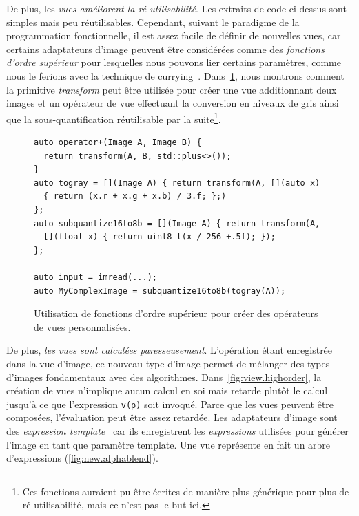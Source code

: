 De plus, les \emph{vues améliorent la ré-utilisabilité}. Les extraits de code ci-dessus sont simples mais peu
réutilisables. Cependant, suivant le paradigme de la programmation fonctionnelle, il est assez facile de définir de
nouvelles vues, car certains adaptateurs d'image peuvent être considérées comme des \emph{fonctions d'ordre supérieur}
pour lesquelles nous pouvons lier certains paramètres, comme nous le ferions avec la technique de
currying~\parencite{hanus.1995.curry}. Dans~\cref{resume:fig:view.highorder}, nous montrons comment la primitive
\emph{transform} peut être utilisée pour créer une vue additionnant deux images et un opérateur de vue effectuant la
conversion en niveaux de gris ainsi que la sous-quantification réutilisable par la suite\footnote{Ces fonctions auraient
  pu être écrites de manière plus générique pour plus de ré-utilisabilité, mais ce n'est pas le but ici.}.

\begin{figure}
  \begin{verbatim}
auto operator+(Image A, Image B) {
  return transform(A, B, std::plus<>());
}
auto togray = [](Image A) { return transform(A, [](auto x)
  { return (x.r + x.g + x.b) / 3.f; };)
};
auto subquantize16to8b = [](Image A) { return transform(A,
  [](float x) { return uint8_t(x / 256 +.5f); });
};

auto input = imread(...);
auto MyComplexImage = subquantize16to8b(togray(A));
  \end{verbatim}

  \caption[]{Utilisation de fonctions d'ordre supérieur pour créer des opérateurs de vues personnalisées.}
  \label{resume:fig:view.highorder}
\end{figure}

De plus, \emph{les vues sont calculées paresseusement}. L'opération étant enregistrée dans la vue d'image, ce nouveau
type d'image permet de mélanger des types d'images fondamentaux avec des algorithmes. Dans~\cref{fig:view.highorder}, la
création de vues n'implique aucun calcul en soi mais retarde plutôt le calcul jusqu'à ce que l'expression \texttt{v(p)}
soit invoqué. Parce que les vues peuvent être composées, l'évaluation peut être assez retardée. Les adaptateurs d'image
sont des \emph{expression template}~\parencite{veldhuizen.1995.expression, veldhuizen.2000.blitz} car ils enregistrent
les \emph{expressions} utilisées pour générer l'image en tant que paramètre template. Une vue représente en fait un
arbre d'expressions (\cref{fig:new.alphablend}).

